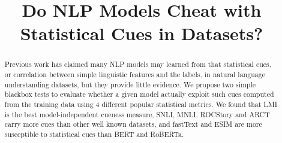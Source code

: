 \documentclass[sigconf]{acmart}
\begin{document}
\title{Do NLP Models Cheat with Statistical Cues in Datasets?}
\begin{abstract}
Previous work has claimed many NLP models may learned from 
that statistical cues, or correlation between simple linguistic features
and the  labels, in natural language understanding datasets, but they
provide little evidence.  
We propose two simple blackbox tests to evaluate whether a given model
actually exploit such cues computed from the training data using 4 different
popular statistical metrics. We found that LMI is the best model-independent
cueness measure, SNLI, MNLI, ROCStory and ARCT carry more cues than other
well known datasets, and fastText and ESIM are more susceptible to statistical
cues than BERT and RoBERTa.
\end{abstract}
%
%



\maketitle

%


%




\end{document}
